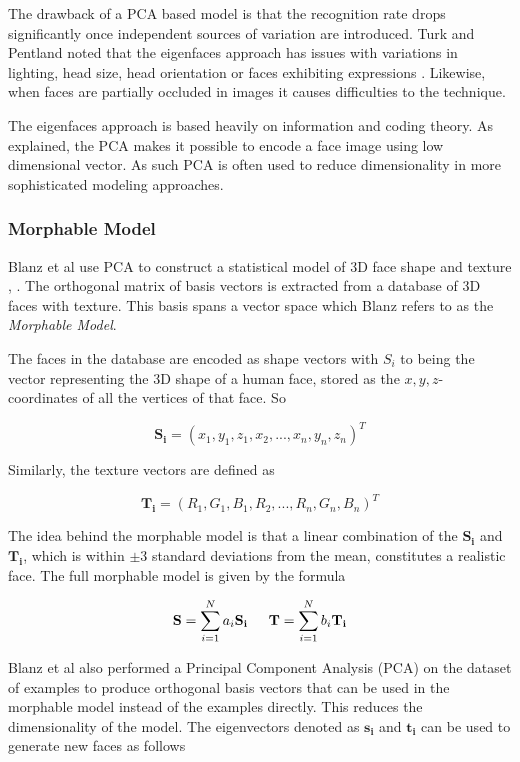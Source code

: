 \documentclass[11pt,a4paper,twoside]{report}
\begin{document}
The drawback of a PCA based model is that the recognition rate drops significantly once
independent sources of variation are introduced. Turk and
Pentland noted that the eigenfaces approach has issues with variations in lighting,
head size, head orientation or faces exhibiting expressions \cite{eigenfaces91}. Likewise, when
faces are partially occluded in images it causes difficulties to the technique. 

The eigenfaces approach is based heavily on information and coding theory. As
explained, the PCA makes it possible to encode a face image
using low dimensional vector. As such PCA is often used to
reduce dimensionality in more sophisticated modeling approaches.

\subsubsection{Morphable Model}
Blanz et al use PCA to construct a statistical model of 3D face shape and
texture \cite{blanz1}, \cite{blanz2}. The orthogonal matrix of basis vectors is
extracted from a database of 3D faces with texture. This basis spans a vector
space which Blanz refers to as the \textit{Morphable Model}.

The faces in the database are encoded as shape vectors with $S_i$ to being the vector representing the 3D shape of a human
face, stored as the $x,y,z$-coordinates of all the vertices of that face. So

\begin{equation}
\mathbf{S_i} = (x_1,y_1,z_1,x_2,...,x_n,y_n,z_n)^T
\end{equation}

Similarly, the texture vectors are defined as

\begin{equation}
\mathbf{T_i} = (R_1,G_1,B_1,R_2,...,R_n,G_n,B_n)^T
\end{equation}

The idea behind the morphable model is that a linear combination of the
$\mathbf{S_i}$ and $\mathbf{T_i}$, which is within $\pm 3$ standard deviations
from the mean, constitutes a realistic face. The full
morphable model is given by the formula

\begin{equation}
\mathbf{S} = \sum_{i=1}^Na_i \mathbf{S_i} \indent \mathbf{T} = \sum_{i=1}^Nb_i \mathbf{T_i}
\end{equation}

Blanz et al also performed a Principal Component Analysis (PCA) on the dataset of examples
to produce orthogonal basis vectors that can be used in the morphable
model instead of the examples directly. This reduces the dimensionality of the
model. The eigenvectors denoted as $\mathbf{s_i}$ and $\mathbf{t_i}$ can be used
to generate new faces as follows
\end{document}
